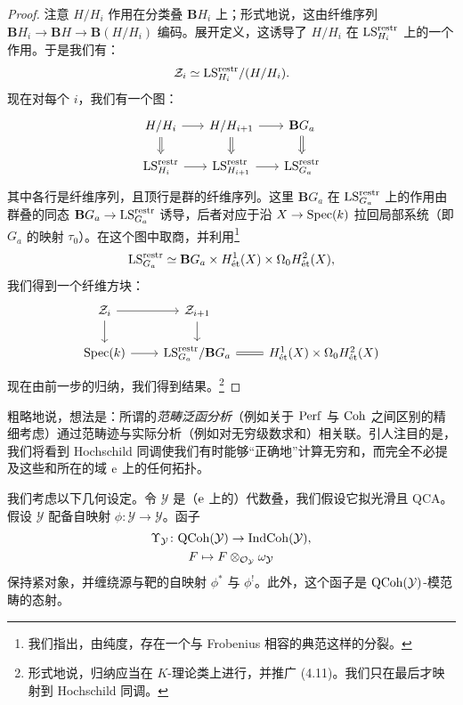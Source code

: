 \begin{proof}
注意 $H/H_i$ 作用在分类叠 $\mathbf{B}H_i$ 上；形式地说，这由纤维序列 $\mathbf{B}H_i\to\mathbf{B}H\to\mathbf{B}(H/H_i)$ 编码。展开定义，这诱导了 $H/H_i$ 在 $\LS^{\restr}_{H_i}$ 上的一个作用。于是我们有：
\[
  \mathcal{Z}_i\simeq\LS^{\restr}_{H_i}/(H/H_i).
\]
现在对每个 $i$，我们有一个图：
\[
\begin{tikzcd}[column sep=1.6em, row sep=1.4em]
  H/H_i \arrow[r] \arrow[d, Rightarrow]
    & H/H_{i+1} \arrow[r] \arrow[d, Rightarrow]
    & \mathbf{B}G_a \arrow[d, Rightarrow]\\
  \LS^{\restr}_{H_i} \arrow[r]
    & \LS^{\restr}_{H_{i+1}} \arrow[r]
    & \LS^{\restr}_{G_a}
\end{tikzcd}
\]
其中各行是纤维序列，且顶行是群的纤维序列。这里 $\mathbf{B}G_a$ 在 $\LS^{\restr}_{G_a}$ 上的作用由群叠的同态 $\mathbf{B}G_a\to\LS^{\restr}_{G_a}$ 诱导，后者对应于沿 $X\to\Spec(k)$ 拉回局部系统（即 $G_a$ 的映射 $\tau_0$）。在这个图中取商，并利用\footnote{我们指出，由纯度，存在一个与 Frobenius 相容的典范这样的分裂。}
\[
  \LS^{\restr}_{G_a}\simeq\mathbf{B}G_a\times H^1_{\et}(X)\times\Om_0H^2_{\et}(X),
\]
我们得到一个纤维方块：
\[
\begin{tikzcd}[column sep=2.2em, row sep=1.6em]
  \mathcal{Z}_i \arrow[r] \arrow[d] & \mathcal{Z}_{i+1} \arrow[d] & \\
  \Spec(k) \arrow[r] & \LS^{\restr}_{G_a}/\mathbf{B}G_a \arrow[r, equal]
    & H^1_{\et}(X)\times\Om_0H^2_{\et}(X)
\end{tikzcd}
\]
现在由前一步的归纳，我们得到结果。\footnote{形式地说，归纳应当在 $K$-理论类上进行，并推广 (4.11)。我们只在最后才映射到 Hochschild 同调。}
\end{proof}


粗略地说，想法是：所谓的\emph{范畴泛函分析}（例如关于 $\Perf$ 与 $\Coh$ 之间区别的精细考虑）通过范畴迹与实际分析（例如对无穷级数求和）相关联。引人注目的是，我们将看到 Hochschild 同调使我们有时能够“正确地”计算无穷和，而完全不必提及这些和所在的域 $\e$ 上的任何拓扑。

我们考虑以下几何设定。令 $\mathcal{Y}$ 是（$\e$ 上的）代数叠，我们假设它拟光滑且 QCA。假设 $\mathcal{Y}$ 配备自映射 $\phi\colon\mathcal{Y}\to\mathcal{Y}$。函子
\[
\begin{gathered}
  \Upsilon_{\mathcal{Y}}\colon\QCoh(\mathcal{Y})\to\IndCoh(\mathcal{Y}),\\
  F\mapsto F\otimes_{\OO_{\mathcal{Y}}}\omega_{\mathcal{Y}}
\end{gathered}
\]
保持紧对象，并缠绕源与靶的自映射 $\phi^*$ 与 $\phi^!$。此外，这个函子是 $\QCoh(\mathcal{Y})$-模范畴的态射。


